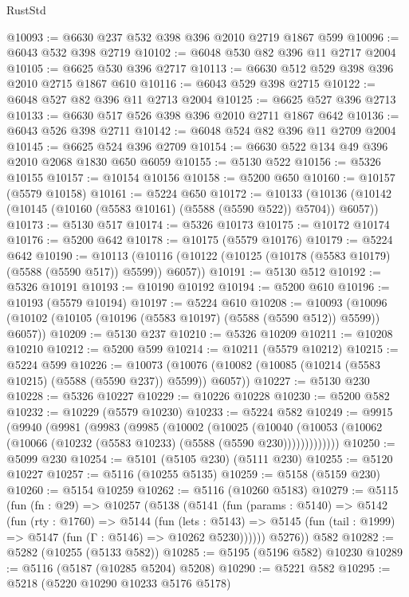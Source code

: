 \begin{lexlean}{RustStd}
\begin{coremodule}
{\begin{coremodule}
{{{{{{{{{{{{{{{{{{{{{{{{{{{{{{{@10093 := @6630 @237 @532 @398 @396 @2010 @2719 @1867 @599
@10096 := @6043 @532 @398 @2719
@10102 := @6048 @530 @82 @396 @11 @2717 @2004
@10105 := @6625 @530 @396 @2717
@10113 := @6630 @512 @529 @398 @396 @2010 @2715 @1867 @610
@10116 := @6043 @529 @398 @2715
@10122 := @6048 @527 @82 @396 @11 @2713 @2004
@10125 := @6625 @527 @396 @2713
@10133 := @6630 @517 @526 @398 @396 @2010 @2711 @1867 @642
@10136 := @6043 @526 @398 @2711
@10142 := @6048 @524 @82 @396 @11 @2709 @2004
@10145 := @6625 @524 @396 @2709
@10154 := @6630 @522 @134 @49 @396 @2010 @2068 @1830 @650 @6059
@10155 := @5130 @522
@10156 := @5326 @10155
@10157 := @10154 @10156
@10158 := @5200 @650
@10160 := @10157 (@5579 @10158)
@10161 := @5224 @650
@10172 := @10133 (@10136 (@10142 (@10145 (@10160 (@5583 @10161) (@5588 (@5590 @522)) @5704)) @6057))
@10173 := @5130 @517
@10174 := @5326 @10173
@10175 := @10172 @10174
@10176 := @5200 @642
@10178 := @10175 (@5579 @10176)
@10179 := @5224 @642
@10190 := @10113 (@10116 (@10122 (@10125 (@10178 (@5583 @10179) (@5588 (@5590 @517)) @5599)) @6057))
@10191 := @5130 @512
@10192 := @5326 @10191
@10193 := @10190 @10192
@10194 := @5200 @610
@10196 := @10193 (@5579 @10194)
@10197 := @5224 @610
@10208 := @10093 (@10096 (@10102 (@10105 (@10196 (@5583 @10197) (@5588 (@5590 @512)) @5599)) @6057))
@10209 := @5130 @237
@10210 := @5326 @10209
@10211 := @10208 @10210
@10212 := @5200 @599
@10214 := @10211 (@5579 @10212)
@10215 := @5224 @599
@10226 := @10073 (@10076 (@10082 (@10085 (@10214 (@5583 @10215) (@5588 (@5590 @237)) @5599)) @6057))
@10227 := @5130 @230
@10228 := @5326 @10227
@10229 := @10226 @10228
@10230 := @5200 @582
@10232 := @10229 (@5579 @10230)
@10233 := @5224 @582
@10249 := @9915
    (@9940
      (@9981
        (@9983
          (@9985
            (@10002
              (@10025
                (@10040
                  (@10053 (@10062 (@10066 (@10232 (@5583 @10233) (@5588 (@5590 @230)))))))))))))
@10250 := @5099 @230
@10254 := @5101 (@5105 @230) (@5111 @230)
@10255 := @5120 @10227
@10257 := @5116 (@10255 @5135)
@10259 := @5158 (@5159 @230)
@10260 := @5154 @10259
@10262 := @5116 (@10260 @5183)
@10279 := @5115
    (fun (fn : @29) =>
    @10257
      (@5138
        (@5141
          (fun (params : @5140) =>
          @5142
            (fun (rty : @1760) =>
            @5144
              (fun (lets : @5143) =>
              @5145 (fun (tail : @1999) => @5147 (fun (Γ : @5146) => @10262 @5230))))))
        @5276))
    @582
@10282 := @5282 (@10255 (@5133 @582))
@10285 := @5195 (@5196 @582) @10230
@10289 := @5116 (@5187 (@10285 @5204) @5208)
@10290 := @5221 @582
@10295 := @5218 (@5220 @10290 @10233 @5176 @5178)
}}}}}}}}}}}}}}}}}}}}}}}}}}}}}}}
\end{coremodule}}
\end{coremodule}
\end{lexlean}
